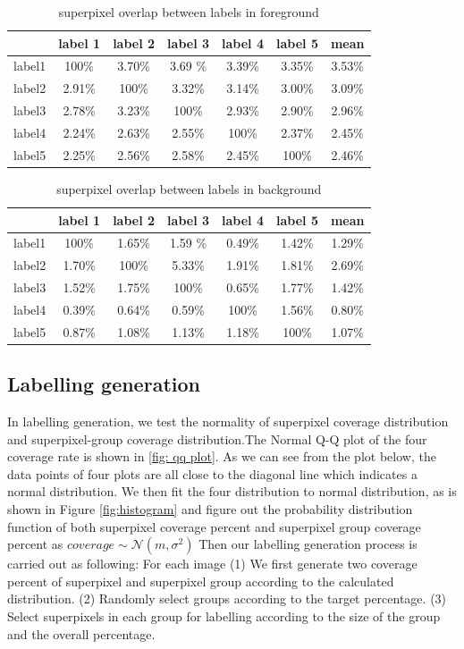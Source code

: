 \documentclass[runningheads,a4paper]{llncs}
\begin{document}
\begin{table}[!tb]
\centering
\caption{superpixel overlap between labels in foreground}
\begin{tabular}{|c|c|c|c|c|c|c|}
\hline
 & label 1 & label 2&label 3&label 4&label 5&mean\\
\hline
label1& 100\% & 3.70\% & 3.69	\%& 3.39\%& 3.35\%& 3.53\%\\
\hline
label2& 2.91\% & 100\% & 3.32\%& 3.14\%& 3.00\% & 3.09\%\\
\hline
label3& 2.78\% & 3.23\% & 100\%& 2.93\%& 2.90\%& 2.96\% \\
\hline
label4& 2.24\% & 2.63\% & 2.55\%& 100\%& 2.37\%& 2.45\%\\
\hline
label5& 2.25\% & 2.56\% & 2.58\%& 2.45\%& 100\%& 2.46\% \\
\hline
\end{tabular}
\captionsetup{justification=centerlast}
\label{ta: sp overlap f}
\end{table}


\begin{table}[!tb]
\centering
\caption{superpixel overlap between labels in background}
\begin{tabular}{|c|c|c|c|c|c|c|}
\hline
 & label 1 & label 2&label 3&label 4&label 5&mean\\
\hline
label1& 100\% & 1.65\% & 1.59	\%& 0.49\%& 1.42\%& 1.29\%\\
\hline
label2& 1.70\% & 100\% & 5.33\%& 1.91\%& 1.81\%& 2.69\% \\
\hline
label3& 1.52\% & 1.75\% & 100\%& 0.65\%& 1.77\%& 1.42\% \\
\hline
label4& 0.39\% & 0.64\% & 0.59\%& 100\%& 1.56\%& 0.80\%\\
\hline
label5& 0.87\% & 1.08\% & 1.13\%& 1.18\%& 100\%& 1.07\% \\
\hline
\end{tabular}
\captionsetup{justification=centerlast}
\label{ta: sp overlap b}
\end{table}


\subsection{Labelling generation}
In labelling generation, we test the normality of superpixel coverage distribution and superpixel-group coverage distribution.The Normal Q-Q plot of the four coverage rate is shown in \ref{fig: qq plot}. As we can see from the plot below, the data points of four plots are all close to the diagonal line which indicates a normal distribution. We then fit the four distribution to normal distribution, as is shown in Figure \ref{fig:histogram} and figure out the probability distribution function of both superpixel coverage percent and superpixel group coverage percent as $coverage \sim \mathcal{N} (m,\sigma^2)$
Then our labelling generation process is carried out as following: For each image (1) We first generate two coverage percent of superpixel and superpixel group according to the calculated  distribution. (2) Randomly select groups according to the target percentage. (3) Select superpixels in each group for labelling according to the size of the group and the overall percentage.
\end{document}
